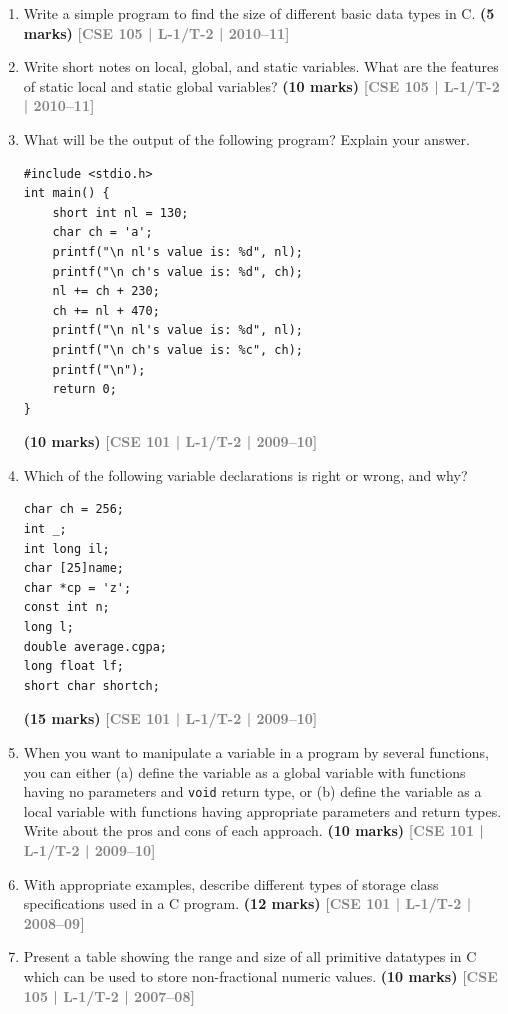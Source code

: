\documentclass[12pt,a3paper]{article}
\newcommand{\yr}[1]{\hfill\textcolor{gray}{\small\textbf{[#1]}}}
\newcommand{\mk}[1]{\textcolor{orange!70!black}{\small\textbf{(#1 marks)}}}
\begin{document}
\begin{enumerate}
\item Write a simple program to find the size of different basic data types in C.
\mk{5} \yr{CSE 105 | L-1/T-2 | 2010--11}

\item Write short notes on local, global, and static variables. What are the features of static local and static global variables?
\mk{10} \yr{CSE 105 | L-1/T-2 | 2010--11}

\item What will be the output of the following program? Explain your answer.
 
\begin{lstlisting}
#include <stdio.h>
int main() {
    short int nl = 130;
    char ch = 'a';
    printf("\n nl's value is: %d", nl);
    printf("\n ch's value is: %d", ch);
    nl += ch + 230;
    ch += nl + 470;
    printf("\n nl's value is: %d", nl);
    printf("\n ch's value is: %c", ch);
    printf("\n");
    return 0;
}
\end{lstlisting}
\mk{10} \yr{CSE 101 | L-1/T-2 | 2009--10}

\item Which of the following variable declarations is right or wrong, and why?
\begin{lstlisting}
char ch = 256;
int _;
int long il;
char [25]name;
char *cp = 'z';
const int n;
long l;
double average.cgpa;
long float lf;
short char shortch;
\end{lstlisting}
\mk{15} \yr{CSE 101 | L-1/T-2 | 2009--10}

\item When you want to manipulate a variable in a program by several functions, you can either (a) define the variable as a global variable with functions having no parameters and \texttt{void} return type, or (b) define the variable as a local variable with functions having appropriate parameters and return types. Write about the pros and cons of each approach.
\mk{10} \yr{CSE 101 | L-1/T-2 | 2009--10}

\item With appropriate examples, describe different types of storage class specifications used in a C program.
\mk{12} \yr{CSE 101 | L-1/T-2 | 2008--09}

\item Present a table showing the range and size of all primitive datatypes in C which can be used to store non-fractional numeric values.
\mk{10} \yr{CSE 105 | L-1/T-2 | 2007--08}


\end{enumerate}
\end{document}
